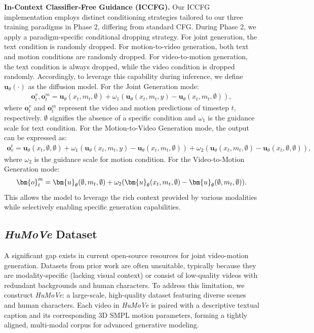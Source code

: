 \textbf{In-Context Classifier-Free Guidance (ICCFG).}
Our ICCFG implementation employs distinct conditioning strategies tailored to our three training paradigms in Phase 2, differing from standard CFG. 
During Phase 2, we apply a paradigm-specific conditional dropping strategy. For joint generation, the text condition is randomly dropped. For motion-to-video generation, both text and motion conditions are randomly dropped. For video-to-motion generation, the text condition is always dropped, while the video condition is dropped randomly.
Accordingly, to leverage this capability during inference, we define $\bm{u}_{\theta}(\cdot)$ as the diffusion model. For the Joint Generation mode:
\begin{align}
    \bm{o}^v_t, \bm{o}^m_t = \bm{u}_{\theta}(x_t, m_t, \emptyset) + \omega_1(\bm{u}_{\theta}(x_t, m_t, y)-\bm{u}_{\theta}(x_t, m_t, \emptyset)),
\end{align}
where $\bm{o}^v_t$ and $\bm{o}^m_t$ represent the video and motion predictions of timestep $t$, respectively. $\emptyset$ signifies the absence of a specific condition and $\omega_1$ is the guidance scale for text condition. For the Motion-to-Video Generation mode, the output can be expressed as:
\begin{align}
\bm{o}_v^t = \bm{u}_{\theta}(x_t, \emptyset, \emptyset) 
    + \omega_1(\bm{u}_{\theta}(x_t, m_t, y) - \bm{u}_{\theta}(x_t,m_t, \emptyset)) + \omega_2(\bm{u}_{\theta}(x_t, m_t, \emptyset) - \bm{u}_{\theta}(x_t, \emptyset, \emptyset)),
\end{align}
 where $\omega_2$ is the guidance scale for motion condition. For the Video-to-Motion Generation mode:
\begin{align}
    \bm{o}^m_t = \bm{u}_{\theta}(\emptyset, m_t, \emptyset) 
    + \omega_2(\bm{u}_{\theta}(x_t, m_t, \emptyset) - \reb{\bm{u}_{\theta}(\emptyset, m_t, \emptyset)}).
\end{align}
This allows the model to leverage the rich context provided by various modalities while selectively enabling specific generation capabilities.



\subsection{\textit{HuMoVe} Dataset}\label{dataset}
A significant gap exists in current open-source resources for joint video-motion generation. Datasets from prior work \citep{mahmood2019amass,lin2023motion,fan2025go} are often unsuitable, typically because they are modality-specific (lacking visual context) or 
consist of low-quality videos with redundant backgrounds and human characters. To address this limitation, we construct \textit{HuMoVe}: a large-scale, high-quality dataset featuring diverse scenes and human characters. Each video in  \textit{HuMoVe} is paired with a descriptive textual caption and its corresponding 3D SMPL motion parameters, forming a tightly aligned, multi-modal corpus for advanced generative modeling.


